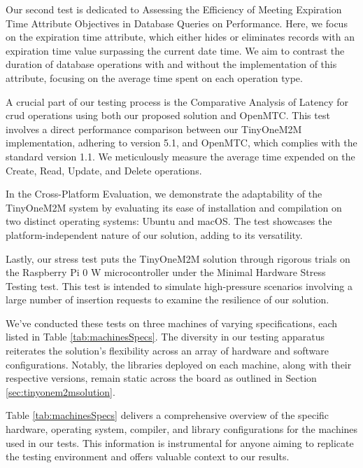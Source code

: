 \documentclass[a4paper,fleqn]{cas-dc}
\begin{document}
Our second test is dedicated to Assessing the Efficiency of Meeting Expiration Time Attribute Objectives in Database Queries on Performance. Here, we focus on the expiration time attribute, which either hides or eliminates records with an expiration time value surpassing the current date time. We aim to contrast the duration of database operations with and without the implementation of this attribute, focusing on the average time spent on each operation type.

A crucial part of our testing process is the Comparative Analysis of Latency for \gls{crud} operations using both our proposed solution and OpenMTC. This test involves a direct performance comparison between our TinyOneM2M implementation, adhering to version 5.1, and OpenMTC, which complies with the standard version 1.1. We meticulously measure the average time expended on the Create, Read, Update, and Delete operations.

In the Cross-Platform Evaluation, we demonstrate the adaptability of the TinyOneM2M system by evaluating its ease of installation and compilation on two distinct operating systems: Ubuntu and macOS. The test showcases the platform-independent nature of our solution, adding to its versatility.

Lastly, our stress test puts the TinyOneM2M solution through rigorous trials on the Raspberry Pi 0 W microcontroller under the Minimal Hardware Stress Testing test. This test is intended to simulate high-pressure scenarios involving a large number of insertion requests to examine the resilience of our solution.

We've conducted these tests on three machines of varying specifications, each listed in Table \ref{tab:machinesSpecs}. The diversity in our testing apparatus reiterates the solution's flexibility across an array of hardware and software configurations. Notably, the libraries deployed on each machine, along with their respective versions, remain static across the board as outlined in Section \ref{sec:tinyonem2msolution}.

Table \ref{tab:machinesSpecs} delivers a comprehensive overview of the specific hardware, operating system, compiler, and library configurations for the machines used in our tests. This information is instrumental for anyone aiming to replicate the testing environment and offers valuable context to our results.
\end{document}
